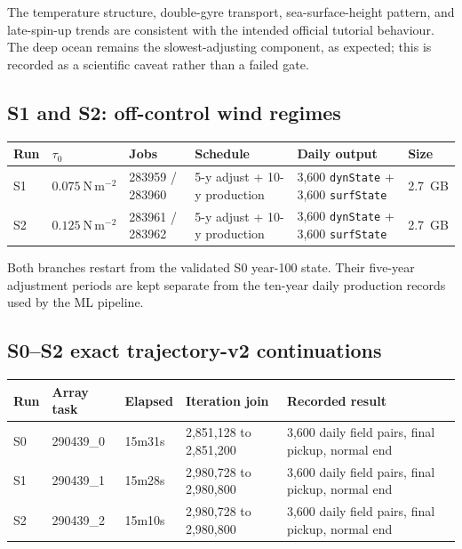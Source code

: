 \documentclass[11pt]{article}
\begin{document}
The temperature structure, double-gyre transport, sea-surface-height pattern, and
late-spin-up trends are consistent with the intended official tutorial behaviour.  The
deep ocean remains the slowest-adjusting component, as expected; this is recorded as a
scientific caveat rather than a failed gate.

\subsection{S1 and S2: off-control wind regimes}

\begin{tabularx}{\textwidth}{@{}p{}p{}p{}p{}YY@{}}
\toprule
\textbf{Run} & \textbf{$\tau_0$} & \textbf{Jobs} & \textbf{Schedule} & \textbf{Daily output} & \textbf{Size} \\
\midrule
S1 & $0.075\ \mathrm{N\,m^{-2}}$ & 283959 / 283960 & 5-y adjust + 10-y production & 3,600 \texttt{dynState} + 3,600 \texttt{surfState} & 2.7~GB \\
S2 & $0.125\ \mathrm{N\,m^{-2}}$ & 283961 / 283962 & 5-y adjust + 10-y production & 3,600 \texttt{dynState} + 3,600 \texttt{surfState} & 2.7~GB \\
\bottomrule
\end{tabularx}

Both branches restart from the validated S0 year-100 state.  Their five-year adjustment
periods are kept separate from the ten-year daily production records used by the ML
pipeline.

\subsection{S0--S2 exact trajectory-v2 continuations}

\begin{tabularx}{\textwidth}{@{}p{}p{}p{}p{}Y@{}}
\toprule
\textbf{Run} & \textbf{Array task} & \textbf{Elapsed} &
\textbf{Iteration join} & \textbf{Recorded result} \\
\midrule
S0 & 290439\_0 & 15m31s & 2,851,128 to 2,851,200 &
3,600 daily field pairs, final pickup, normal end \\
S1 & 290439\_1 & 15m28s & 2,980,728 to 2,980,800 &
3,600 daily field pairs, final pickup, normal end \\
S2 & 290439\_2 & 15m10s & 2,980,728 to 2,980,800 &
3,600 daily field pairs, final pickup, normal end \\
\bottomrule
\end{tabularx}
\end{document}
